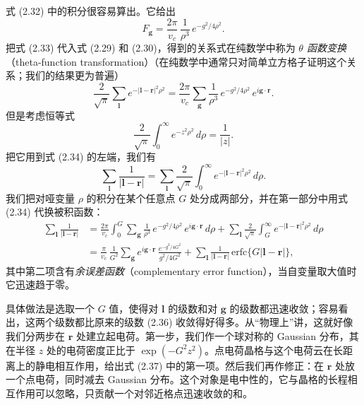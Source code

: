 式 (2.32) 中的积分很容易算出。它给出
\begin{equation*}
F_{\boldsymbol{g}} = \frac{2\pi}{v_c}\,\frac{1}{\rho^3}\, e^{-g^2/4\rho^2}.
\tag{2.33}
\end{equation*}
把式 (2.33) 代入式 (2.29) 和 (2.30)，得到的关系式在纯数学中称为 \emph{$\theta$ 函数变换}（theta-function transformation）（在纯数学中通常只对简单立方格子证明这个关系；我们的结果更为普遍）
\begin{equation*}
\frac{2}{\sqrt{\pi}}\sum_{\boldsymbol{l}} e^{-|\boldsymbol{l}-\mathbf{r}|^2\rho^2} = \frac{2\pi}{v_c}\sum_{\boldsymbol{g}}\frac{1}{\rho^3}\, e^{-g^2/4\rho^2}\, e^{i\boldsymbol{g}\cdot\mathbf{r}}.
\tag{2.34}
\end{equation*}
但是考虑恒等式
\begin{equation*}
\frac{2}{\sqrt{\pi}}\int_0^\infty e^{-z^2\rho^2}\, d\rho = \frac{1}{|z|}.
\tag{2.35}
\end{equation*}
把它用到式 (2.34) 的左端，我们有
\begin{equation*}
\sum_{\boldsymbol{l}}\frac{1}{|\boldsymbol{l}-\mathbf{r}|} = \sum_{\boldsymbol{l}}\frac{2}{\sqrt{\pi}}\int_0^\infty e^{-|\boldsymbol{l}-\mathbf{r}|^2\rho^2}\, d\rho.
\tag{2.36}
\end{equation*}
我们把对哑变量 $\rho$ 的积分在某个任意点 $G$ 处分成两部分，并在第一部分中用式 (2.34) 代换被积函数：
\begin{align*}
\sum_{\boldsymbol{l}}\frac{1}{|\boldsymbol{l}-\mathbf{r}|} &= \frac{2\pi}{v_c}\int_0^G \sum_{\boldsymbol{g}}\frac{1}{\rho^3}\, e^{-g^2/4\rho^2}\, e^{i\boldsymbol{g}\cdot\mathbf{r}}\, d\rho + \sum_{\boldsymbol{l}}\frac{2}{\sqrt{\pi}}\int_G^\infty e^{-|\boldsymbol{l}-\mathbf{r}|^2\rho^2}\, d\rho \\
&= \frac{\pi}{v_c}\,\frac{1}{G^2}\sum_{\boldsymbol{g}} e^{i\boldsymbol{g}\cdot\mathbf{r}}\,\frac{e^{-g^2/4G^2}}{g^2/4G^2} + \sum_{\boldsymbol{l}}\frac{1}{|\boldsymbol{l}-\mathbf{r}|}\,\mathrm{erfc}\{G|\boldsymbol{l}-\mathbf{r}|\},
\tag{2.37}
\end{align*}
其中第二项含有\emph{余误差函数}（complementary error function），当自变量取大值时它迅速趋于零。

具体做法是选取一个 $G$ 值，使得对 $\boldsymbol{l}$ 的级数和对 $\boldsymbol{g}$ 的级数都迅速收敛；容易看出，这两个级数都比原来的级数 (2.36) 收敛得好得多。从“物理上”讲，这就好像我们分两步在 $\mathbf{r}$ 处建立起电荷。第一步，我们作一个球对称的 Gaussian 分布，其在半径 $z$ 处的电荷密度正比于 $\exp(-G^2z^2)$。点电荷晶格与这个电荷云在长距离上的静电相互作用，给出式 (2.37) 中的第一项。然后我们再作修正：在 $\mathbf{r}$ 处放一个点电荷，同时减去 Gaussian 分布。这个对象是电中性的，它与晶格的长程相互作用可以忽略，只贡献一个对邻近格点迅速收敛的和。

